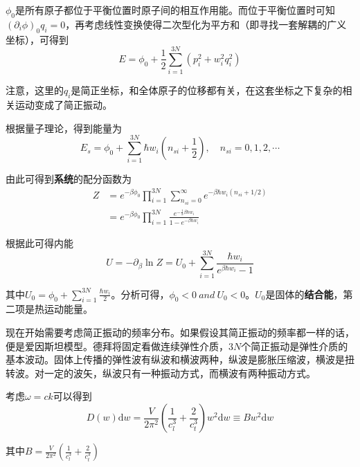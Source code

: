 \documentclass[UTF8]{ctexart}
\newcommand{\dif}{\mathrm{d}}
\begin{document}
\noindent $ \phi_{0} $是所有原子都位于平衡位置时原子间的相互作用能。而位于平衡位置时可知$ \left(\partial_{i} \phi\right)_{0} q_{i}=0 $，再考虑线性变换使得二次型化为平方和（即寻找一套解耦的广义坐标），可得到
\begin{equation}
E=\phi_{0}+\frac{1}{2} \sum_{i=1}^{3 N}\left(p_{i}^{2}+w_{i}^{2} q_{i}^{2}\right)
\end{equation}

注意，这里的$ q_{i} $是简正坐标，和全体原子的位移都有关，在这套坐标之下复杂的相关运动变成了简正振动。

	根据量子理论，得到能量为
	\begin{equation}
	E_{s}=\phi_{0}+\sum_{i=1}^{3 N} \hbar w_{i}\left(n_{s i}+\frac{1}{2}\right), \quad n_{s i}=0,1,2, \cdots
	\end{equation}
	
\noindent 由此可得到\textbf{系统}的配分函数为
\begin{equation}
	\begin{aligned}
	Z&=e^{-\beta \phi_{0}} \prod_{i=1}^{3 N} \sum_{n_{s i}=0}^{\infty} e^{-\beta \hbar w_{i}\left(n_{s i}+1 / 2\right)}\\
	&=e^{-\beta \phi_{0}} \prod_{i=1}^{3 N} \frac{e^{-\frac{1}{2} \beta \hbar w_{i}}}{1-e^{-\beta \hbar w_{i}}}
	\end{aligned}\label{equ_Z_si}
\end{equation}

\noindent 根据此可得内能
\begin{equation}
	U=-\partial_{\beta} \ln Z=U_{0}+\sum_{i=1}^{3 N} \frac{\hbar w_{i}}{e^{\beta \hbar w_{i}}-1}
\end{equation}

\noindent 其中$U_{0}=\phi_{0}+\sum_{i=1}^{3 N} \frac{\hbar w_{i}}{2}$。分析可得，$ \phi_{0}<0 \ and\ U_{0}<0 $。$ U_{0} $是固体的\textbf{结合能}，第二项是热运动能量。

	现在开始需要考虑简正振动的频率分布。如果假设其简正振动的频率都一样的话，便是爱因斯坦模型。德拜将固定看做连续弹性介质，$ 3N $个简正振动是弹性介质的基本波动。固体上传播的弹性波有纵波和横波两种，纵波是膨胀压缩波，横波是扭转波。对一定的波矢，纵波只有一种振动方式，而横波有两种振动方式。
	
	考虑$ \omega=ck $可以得到
	\begin{equation}
		D(w) \dif w=\frac{V}{2 \pi^{2}}\left(\frac{1}{c_{l}^{3}}+\frac{2}{c_{t}^{3}}\right) w^{2} \dif w \equiv B w^{2} \dif w
	\end{equation}
	
\noindent 其中$ B=\frac{V}{2 \pi^{2}} \left(\frac{1}{c_{l}^{3}}+\frac{2}{c_{t}^{3}}\right) $
\end{document}
